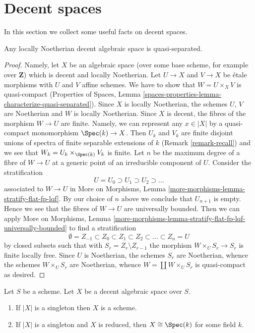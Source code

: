 \section{Decent spaces}
\label{section-decent}

\noindent
In this section we collect some useful facts on decent spaces.

\begin{lemma}
\label{lemma-locally-Noetherian-decent-quasi-separated}
Any locally Noetherian decent algebraic space is quasi-separated.
\end{lemma}

\begin{proof}
Namely, let $X$ be an algebraic space (over some base scheme, for
example over $\mathbf{Z}$) which is decent and locally Noetherian.
Let $U \to X$ and $V \to X$ be \'etale morphisms with $U$ and $V$
affine schemes. We have to show that $W = U \times_X V$ is quasi-compact
(Properties of Spaces, Lemma
\ref{spaces-properties-lemma-characterize-quasi-separated}).
Since $X$ is locally Noetherian, the schemes $U$, $V$ are Noetherian
and $W$ is locally Noetherian. Since $X$ is decent, the fibres
of the morphism $W \to U$ are finite. Namely, we can represent
any $x \in |X|$ by a quasi-compact monomorphism $\Spec(k) \to X$.
Then $U_k$ and $V_k$ are finite disjoint unions of spectra of
finite separable extensions of $k$ (Remark \ref{remark-recall})
and we see that $W_k = U_k \times_{\Spec(k)} V_k$ is finite.
Let $n$ be the maximum degree of a fibre of $W \to U$ at a generic
point of an irreducible component of $U$. Consider the stratification
$$
U = U_0 \supset U_1 \supset U_2 \supset \ldots
$$
associated to $W \to U$ in
More on Morphisms, Lemma \ref{more-morphisms-lemma-stratify-flat-fp-lqf}.
By our choice of $n$ above we conclude that $U_{n + 1}$ is empty.
Hence we see that the fibres of $W \to U$ are universally bounded.
Then we can apply More on Morphisms, Lemma
\ref{more-morphisms-lemma-stratify-flat-fp-lqf-universally-bounded}
to find a stratification
$$
\emptyset = Z_{-1} \subset Z_0 \subset Z_1 \subset Z_2 \subset
\ldots \subset Z_n = U
$$
by closed subsets such that with $S_r = Z_r \setminus Z_{r - 1}$
the morphism $W \times_U S_r \to S_r$ is finite locally free.
Since $U$ is Noetherian, the schemes $S_r$ are Noetherian,
whence the schemes $W \times_U S_r$ are Noetherian, whence
$W = \coprod W \times_U S_r$ is quasi-compact as desired.
\end{proof}

\begin{lemma}
\label{lemma-when-field}
Let $S$ be a scheme. Let $X$ be a decent algebraic space over $S$.
\begin{enumerate}
\item If $|X|$ is a singleton then $X$ is a scheme.
\item If $|X|$ is a singleton and $X$ is reduced, then
$X \cong \Spec(k)$ for some field $k$.
\end{enumerate}
\end{lemma}

